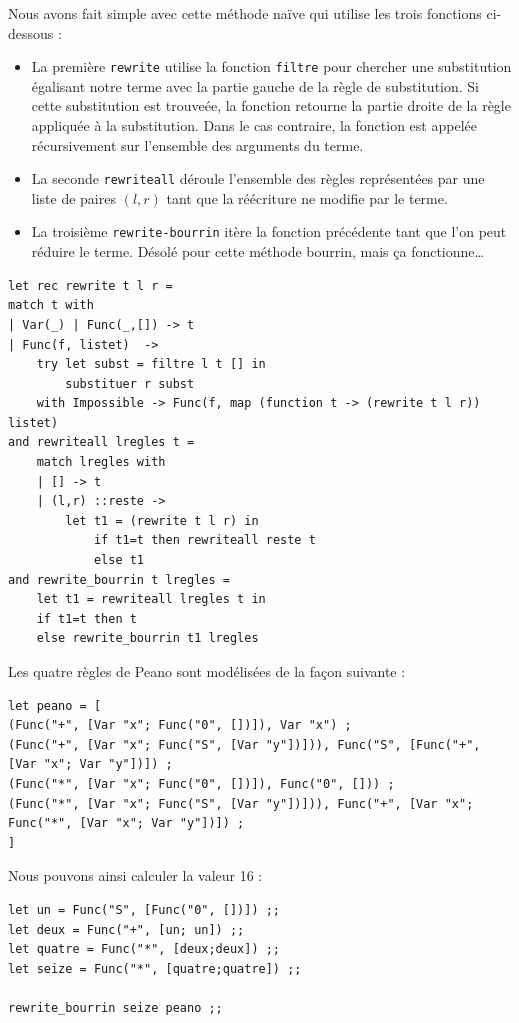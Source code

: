Nous avons fait simple avec cette méthode naïve qui utilise les trois fonctions ci-dessous :
\begin{itemize}
	\item La première \texttt{rewrite} utilise la fonction \texttt{filtre} pour chercher une substitution
	égalisant notre terme avec la partie gauche de la règle de substitution. Si cette substitution est trouveée, la 
	fonction retourne la partie droite de la règle appliquée à la substitution. Dans le cas contraire, la fonction
	est appelée récursivement sur l'ensemble des arguments du terme.
	\item  La seconde \texttt{rewriteall} déroule l'ensemble des règles représentées par une liste de paires $(l,r)$ tant
	que la réécriture ne modifie par le terme.
	\item La troisième \texttt{rewrite-bourrin} itère la fonction précédente tant que l'on peut réduire le terme.
	Désolé pour cette méthode bourrin, mais ça fonctionne\dots
\end{itemize}

\begin{verbatim}
let rec rewrite t l r =
match t with
| Var(_) | Func(_,[]) -> t
| Func(f, listet)  -> 
	try let subst = filtre l t [] in
		substituer r subst 
	with Impossible -> Func(f, map (function t -> (rewrite t l r)) listet)
and rewriteall lregles t =
	match lregles with
	| [] -> t
	| (l,r) ::reste -> 
		let t1 = (rewrite t l r) in
			if t1=t then rewriteall reste t 
			else t1
and rewrite_bourrin t lregles =
	let t1 = rewriteall lregles t in
	if t1=t then t
	else rewrite_bourrin t1 lregles
\end{verbatim}

Les quatre règles de Peano sont modélisées de la façon suivante :
\begin{verbatim}
let peano = [
(Func("+", [Var "x"; Func("0", [])]), Var "x") ;
(Func("+", [Var "x"; Func("S", [Var "y"])])), Func("S", [Func("+", [Var "x"; Var "y"])]) ;
(Func("*", [Var "x"; Func("0", [])]), Func("0", [])) ;
(Func("*", [Var "x"; Func("S", [Var "y"])])), Func("+", [Var "x"; Func("*", [Var "x"; Var "y"])]) ;
] 
\end{verbatim}

Nous pouvons ainsi calculer la valeur 16 :
\begin{verbatim}
let un = Func("S", [Func("0", [])]) ;;
let deux = Func("+", [un; un]) ;;
let quatre = Func("*", [deux;deux]) ;;
let seize = Func("*", [quatre;quatre]) ;;

rewrite_bourrin seize peano ;;    
	
\end{verbatim}



